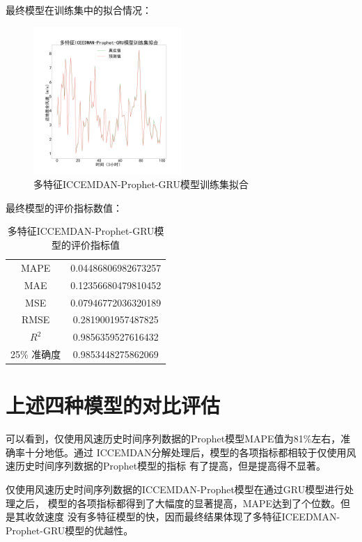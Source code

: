 \documentclass[AutoFakeBold]{LZUThesis}
\begin{document}
最终模型在训练集中的拟合情况：

\begin{figure}[H]
	\centering
    \includegraphics[width=0.5\textwidth]{figures/all_prophet_gru_predict_train.pdf}
    \caption{多特征ICCEMDAN-Prophet-GRU模型训练集拟合}
    \label{fig_all_prophet_gru_predict_train}
\end{figure}

最终模型的评价指标数值：

\begin{table}[H]
    \centering
    \caption{多特征ICCEMDAN-Prophet-GRU模型的评价指标值}
    \begin{tabular}{cc}
    \toprule
    MAPE & 0.04486806982673257 \\
    MAE & 0.12356680479810452 \\
    MSE & 0.07946772036320189 \\
    RMSE & 0.2819001957487825 \\
    $R^2$ & 0.9856359527616432 \\
    25\% 准确度 & 0.9853448275862069 \\
    \bottomrule
    \end{tabular}
    \label{all_prophet_gru_result}
\end{table}

\section{上述四种模型的对比评估}

可以看到，仅使用风速历史时间序列数据的Prophet模型MAPE值为81\%左右，准确率十分地低。通过
ICCEMDAN分解处理后，模型的各项指标都相较于仅使用风速历史时间序列数据的Prophet模型的指标
有了提高，但是提高得不显著。

仅使用风速历史时间序列数据的ICCEMDAN-Prophet模型在通过GRU模型进行处理之后，
模型的各项指标都得到了大幅度的显著提高，MAPE达到了个位数。但是其收敛速度
没有多特征模型的快，因而最终结果体现了多特征ICEEDMAN-Prophet-GRU模型的优越性。
\end{document}
